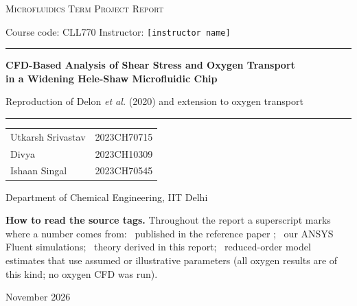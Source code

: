\begin{titlepage}
\centering
\vspace*{8mm}
{\large\scshape Microfluidics \textendash{} Term Project Report\par}
\vspace{2mm}
{\normalsize Course code: CLL770 \quad Instructor: \texttt{[instructor name]}\par}
\vspace{18mm}
{\color{MidnightBlue}\rule{\linewidth}{1pt}\par}
\vspace{5mm}
{\LARGE\bfseries CFD-Based Analysis of Shear Stress and Oxygen Transport\\[2mm] in a Widening Hele-Shaw Microfluidic Chip\par}
\vspace{4mm}
{\large Reproduction of Delon \emph{et al.} (2020) and extension to oxygen transport\par}
\vspace{5mm}
{\color{MidnightBlue}\rule{\linewidth}{1pt}\par}
\vspace{16mm}
{\large
\begin{tabular}{ll}
Utkarsh Srivastav & 2023CH70715\\
Divya & 2023CH10309\\
Ishaan Singal & 2023CH70545
\end{tabular}\par}
\vspace{10mm}
{\normalsize Department of Chemical Engineering, IIT Delhi\par}
\vfill
\begin{minipage}{0.86\linewidth}
\small
\textbf{How to read the source tags.} Throughout the report a superscript marks where a number comes from:
\tagP\ published in the reference paper \citep{Delon2020};
\tagC\ our ANSYS Fluent simulations;
\tagT\ theory derived in this report;
\tagM\ reduced-order model estimates that use assumed or illustrative parameters (all oxygen results are of this kind; no oxygen CFD was run).
\end{minipage}
\vspace{10mm}

{\normalsize November 2026\par}
\end{titlepage}
